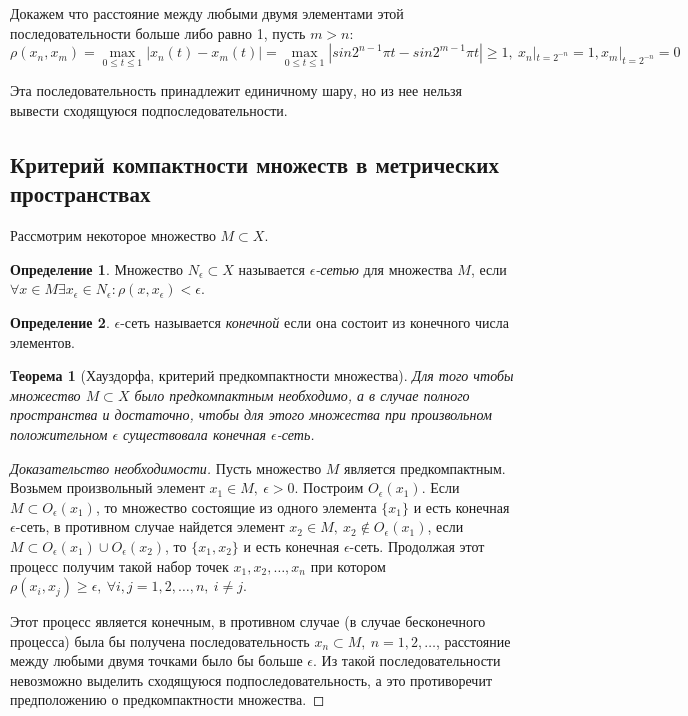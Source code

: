 \documentclass[14pt,a4paper]{extarticle}
\newtheorem{theorem}{Теорема}[section]
\theoremstyle{definition}
\newtheorem{definition}{Определение}[section]
\theoremstyle{remark}
\renewcommand{\[}{\begin{dmath*}[compact]}
\renewcommand{\]}{\end{dmath*}}
\newcommand{\sep}{ , \ \allowbreak }
\begin{document}
Докажем что расстояние между любыми двумя элементами этой последовательности
больше либо равно 1, пусть $m>n$:
\[\rho(x_n,x_m) = {\max_{0\leq t \leq 1} |x_n(t)-x_m(t)|} \allowbreak=
\max_{0\leq t \leq 1} |sin 2^{n-1}\pi t-\allowbreak
sin 2^{m-1}\pi t|\geq 1 \sep x_n|_{t=2^{-n}}=1, x_m|_{t=2^{-n}}=0 \]

Эта последовательность принадлежит единичному шару,
но из нее нельзя вывести сходящуюся подпоследовательности.

\subsection{Критерий компактности множеств в метрических пространствах}

Рассмотрим некоторое множество $M\subset X$.

\begin{definition}
  Множество $N_{\epsilon} \subset X$ называется \textit{$\epsilon$-сетью} для
  множества $M$, если $\forall x \in M \exists x_{\epsilon} \in N_{\epsilon}:
  \rho(x,x_{\epsilon})<\epsilon$.
\end{definition}
\begin{definition}
  $\epsilon$-сеть называется \textit{конечной} если она состоит из
  конечного числа элементов.
\end{definition}

\begin{theorem}[Хауздорфа, критерий предкомпактности множества]
  Для того чтобы множество $M \subset X$ было предкомпактным необходимо,
  а в случае полного пространства и достаточно,
  чтобы для этого множества при произвольном положительном $\epsilon$
  существовала конечная $\epsilon$-сеть.
\end{theorem}

\begin{proof}[Доказательство необходимости]
  Пусть множество $M$ является предкомпактным.
  Возьмем произвольный элемент $x_1 \in M\sep \epsilon > 0$.
  Построим $O_{\epsilon}(x_1)$.
  Если $M \subset O_{\epsilon}(x_1)$,
  то множество состоящие из одного элемента $\{x_1\}$ и есть
  конечная $\epsilon$-сеть, в противном случае найдется элемент
  $x_2 \in M\sep x_2 \not\in O_\epsilon(x_1)$,
  если $M\subset O_\epsilon(x_1)\cup O_\epsilon(x_2)$,
  то $\{x_1,x_2\}$ и есть конечная $\epsilon$-сеть.
  Продолжая этот процесс получим такой набор точек $x_1, x_2,\dots,x_n$
  при котором $\rho(x_i,x_j)\geq \epsilon\sep \forall i,j=1,2,\dots,n \sep
  i \neq j$.

  Этот процесс является конечным, в противном случае
  (в случае бесконечного процесса) была бы получена последовательность
  ${x_n}\subset M\sep n=1,2,\dots$, расстояние между любыми двумя точками
  было бы больше $\epsilon$.
  Из такой последовательности невозможно выделить сходящуюся
  подпоследовательность,
  а это противоречит предположению о предкомпактности множества.
\end{proof}
\end{document}
